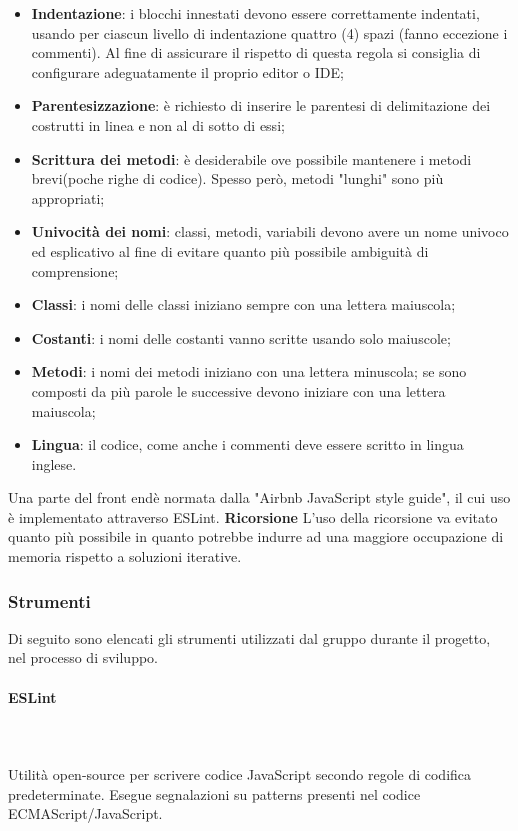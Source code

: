 			\begin{itemize}
				\item \textbf{Indentazione}: i blocchi innestati devono essere correttamente indentati, usando per ciascun livello di indentazione quattro (4) spazi (fanno eccezione i commenti). Al fine di assicurare il rispetto di questa regola si consiglia di configurare adeguatamente il proprio editor o IDE;
				\item \textbf{Parentesizzazione}: è richiesto di inserire le parentesi di delimitazione dei costrutti in linea e non al di sotto di essi;
				\item \textbf{Scrittura dei metodi}: è desiderabile ove possibile mantenere i metodi brevi(poche righe di codice). Spesso però, metodi "lunghi" sono più appropriati;
				\item \textbf{Univocità dei nomi}: classi, metodi, variabili devono avere un nome univoco	ed esplicativo al fine di evitare quanto più possibile ambiguità di comprensione;
				\item \textbf{Classi}: i nomi delle classi iniziano sempre con una lettera maiuscola;
				\item \textbf{Costanti}: i nomi delle costanti vanno scritte usando solo maiuscole;
				\item \textbf{Metodi}: i nomi dei metodi iniziano con una lettera minuscola;
				se sono composti da più parole le successive devono iniziare con una lettera
				maiuscola;
				\item \textbf{Lingua}: il codice, come anche i commenti deve essere scritto in lingua inglese.
			\end{itemize}
			Una parte del front end\glosp è normata dalla "Airbnb JavaScript style guide", il cui uso è implementato attraverso ESLint\glo. \newline \newline
			\textbf{Ricorsione} \newline \newline
			L'uso della ricorsione va evitato quanto più possibile in  quanto  potrebbe
			indurre  ad  una  maggiore  occupazione  di  memoria  rispetto  a  soluzioni
			iterative.
	\subsubsection{Strumenti}
	Di seguito sono elencati gli strumenti utilizzati dal gruppo durante il progetto, nel processo di sviluppo.
		\paragraph{ESLint} \mbox{}\\ \mbox{}\\
		Utilità open-source per scrivere codice JavaScript secondo regole di codifica predeterminate. Esegue segnalazioni su patterns presenti nel codice ECMAScript/JavaScript.
